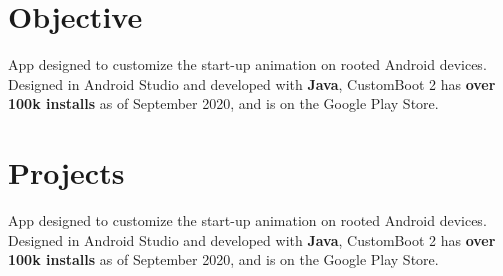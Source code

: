 \documentclass[letterpaper]{deedy-resume} %
\begin{document}
\begin{minipage}[t]{0.33\textwidth}
\sectionspace %



\end{minipage} %
\hfill
%
%
\begin{minipage}[t]{0.66\textwidth} %



\section{Objective}


App designed to customize the start-up animation on rooted Android devices. Designed in Android Studio and developed with \textbf{Java}, CustomBoot 2 has \textbf{over 100k installs} as of September 2020, and is on the Google Play Store.

\sectionspace %







\section{Projects}


App designed to customize the start-up animation on rooted Android devices. Designed in Android Studio and developed with \textbf{Java}, CustomBoot 2 has \textbf{over 100k installs} as of September 2020, and is on the Google Play Store.


\end{minipage}
\end{document}
